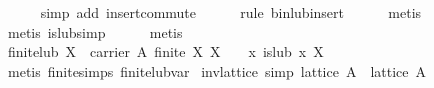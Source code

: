 \begin{isabellebody}
\ \ \ \ \isamarkupfalse%
\ {}simp\ add{}\ insert{}commute{}\isanewline
\ \ \ \ \isamarkupfalse%
\ {}rule\ bin{}lub{}insert{}\isanewline
\ \ \ \ \isamarkupfalse%
\ metis\isanewline
\ \ \ \ \isamarkupfalse%
\ {}metis\ is{}lub{}simp{}\isanewline
\ \ \ \ \isamarkupfalse%
\ metis%
\endisatagproof
{\isafoldproof}%
%
\isadelimproof
\isanewline
%
\endisadelimproof
\isanewline
\ \ \isamarkupfalse%
\ finite{}lub{}\ {}{}X\ {}\ carrier\ A{}\ finite\ X{}\ X\ {}\ {}{}{}\ {}\ {}x{}\ is{}lub\ x\ X{}\isanewline
%
\isadelimproof
\ \ \ \ %
\endisadelimproof
%
\isatagproof
{}\isamarkupfalse%
\ {}metis\ finite{}simps\ finite{}lub{}var{}%
\endisatagproof
{\isafoldproof}%
%
\isadelimproof
\isanewline
%
\endisadelimproof
\isanewline
{}\isamarkupfalse%
\isanewline
\isanewline
{}\isamarkupfalse%
\ inv{}lattice\ {}simp{}{}\ {}lattice\ {}A{}{}\ {}\ lattice\ A{}\isanewline
%
\isadelimproof

\end{isabellebody}
